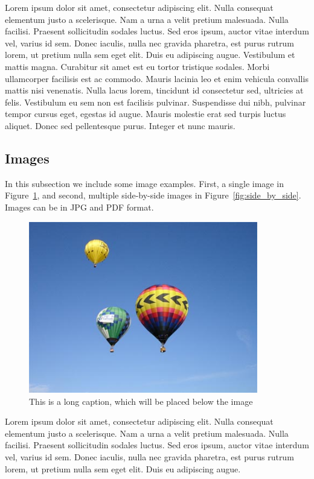 Lorem ipsum dolor sit amet, consectetur adipiscing elit. Nulla consequat elementum justo a scelerisque. Nam a urna a velit pretium malesuada. Nulla facilisi. Praesent sollicitudin sodales luctus. Sed eros ipsum, auctor vitae interdum vel, varius id sem. Donec iaculis, nulla nec gravida pharetra, est purus rutrum lorem, ut pretium nulla sem eget elit. Duis eu adipiscing augue. Vestibulum et mattis magna. Curabitur sit amet est eu tortor tristique sodales. Morbi ullamcorper facilisis est ac commodo. Mauris lacinia leo et enim vehicula convallis mattis nisi venenatis. Nulla lacus lorem, tincidunt id consectetur sed, ultricies at felis. Vestibulum eu sem non est facilisis pulvinar. Suspendisse dui nibh, pulvinar tempor cursus eget, egestas id augue. Mauris molestie erat sed turpis luctus aliquet. Donec sed pellentesque purus. Integer et nunc mauris.

\subsection{Images}

In this subsection we include some image examples. First, a single image in Figure~\ref{fig:single_image}, and second, multiple side-by-side images in Figure~\ref{fig:side_by_side}. Images can be in JPG and PDF format.

\begin{figure}[h]
\centering
\includegraphics[width=10cm]{gfx/sample1}
\caption[This is a short caption for the index]{This is a long caption, which will be placed below the image}
\label{fig:single_image}
\end{figure}

Lorem ipsum dolor sit amet, consectetur adipiscing elit. Nulla consequat elementum justo a scelerisque. Nam a urna a velit pretium malesuada. Nulla facilisi. Praesent sollicitudin sodales luctus. Sed eros ipsum, auctor vitae interdum vel, varius id sem. Donec iaculis, nulla nec gravida pharetra, est purus rutrum lorem, ut pretium nulla sem eget elit. Duis eu adipiscing augue.

